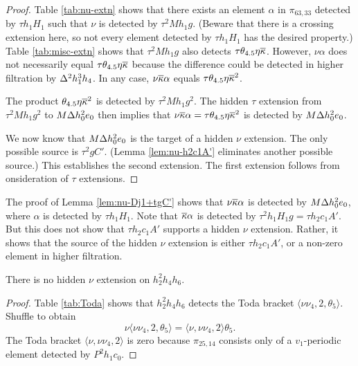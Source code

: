 \begin{proof}
Table \ref{tab:nu-extn} shows that there exists an element
$\alpha$ in $\pi_{63,33}$ detected by $\tau h_1 H_1$ such that
$\nu$ is detected by $\tau^2 M h_1 g$.
(Beware that there is a crossing extension here, so not every
element detected by $\tau h_1 H_1$ has the desired property.)
Table \ref{tab:misc-extn} shows that 
$\tau^2 M h_1 g$ also detects $\tau \theta_{4.5} \eta \overline{\kappa}$.
However, $\nu \alpha$ does not necessarily equal
$\tau \theta_{4.5} \eta \overline{\kappa}$ because the difference could
be detected in higher filtration by $\Delta^2 h_1^3 h_4$.
In any case,
$\nu \overline{\kappa} \alpha$ equals $\tau \theta_{4.5} \eta \overline{\kappa}^2$.

The product $\theta_{4.5} \eta \overline{\kappa}^2$
is detected by $\tau^2 M h_1 g^2$.
The hidden $\tau$ extension from $\tau^2 M h_1 g^2$ to
$M \Delta h_0^2 e_0$ then implies that
$\nu \overline{\kappa} \alpha = \tau \theta_{4.5} \eta \overline{\kappa}^2$
is detected by $M \Delta h_0^2 e_0$.

We now know that $M \Delta h_0^2 e_0$ is the target of a hidden
$\nu$ extension.
The only possible source is $\tau^2 g C'$. (Lemma \ref{lem:nu-h2c1A'}
eliminates another possible source.)
This establishes the second extension.
The first extension follows from onsideration of $\tau$ extensions.
\end{proof}

\begin{remark}
\label{rem:nu-Dj1+tgC'}
The proof of Lemma \ref{lem:nu-Dj1+tgC'} shows that
$\nu \overline{\kappa} \alpha$ is detected by $M \Delta h_0^2 e_0$,
where $\alpha$ is detected by $\tau h_1 H_1$.
Note that $\overline{\kappa} \alpha$ is detected by $\tau^2 h_1 H_1 g =
\tau h_2 c_1 A'$.  But this does not show that 
$\tau h_2 c_1 A'$ supports a hidden $\nu$ extension.  Rather,
it shows that the source of the hidden $\nu$ extension is
either $\tau h_2 c_1 A'$, or a non-zero element in higher filtration.
\end{remark}

\begin{lemma}
\label{lem:nu-h2^2h4h6}
There is no hidden $\nu$ extension on $h_2^2 h_4 h_6$.
\end{lemma}

\begin{proof}
Table \ref{tab:Toda} shows that $h_2^2 h_4 h_6$ detects the 
Toda bracket $\langle \nu \nu_4, 2, \theta_5 \rangle$.
Shuffle to obtain
\[
\nu \langle \nu \nu_4, 2, \theta_5 \rangle = 
\langle \nu, \nu \nu_4, 2 \rangle \theta_5.
\]
The Toda bracket $\langle \nu, \nu \nu_4, 2 \rangle$
is zero because $\pi_{25,14}$ consists only of a $v_1$-periodic
element detected by $P^2 h_1 c_0$.
\end{proof}

